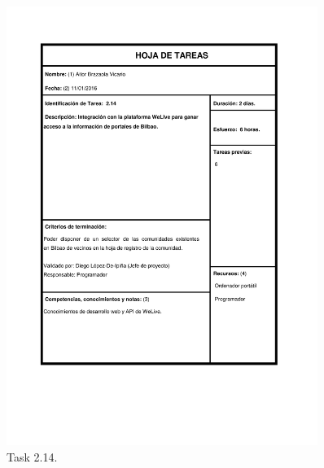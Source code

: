 \documentclass{DeustoFDP}
\begin{document}
\begin{figure}[H]
	\centering
	\includegraphics[width=0.9\textwidth]{fig/Tareas/214}
	\caption{Task 2.14.}
	\label{fig:t214}
\end{figure}
\end{document}
